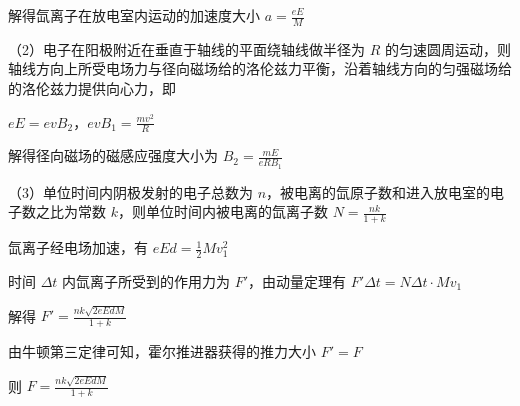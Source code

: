 \documentclass[\gkver]{gaokaozhenti}
\begin{document}
\begin{enumerate}
{解得氙离子在放电室内运动的加速度大小 $a = \frac{eE}{M}$

（2）电子在阳极附近在垂直于轴线的平面绕轴线做半径为 $R$ 的匀速圆周运动，则轴线方向上所受电场力与径向磁场给的洛伦兹力平衡，沿着轴线方向的匀强磁场给的洛伦兹力提供向心力，即

$eE = evB_{2}$，$evB_{1} = \frac{mv^{2}}{R}$

解得径向磁场的磁感应强度大小为 $B_{2} = \frac{mE}{eRB_{1}}$

（3）单位时间内阴极发射的电子总数为 $n$，被电离的氙原子数和进入放电室的电子数之比为常数 $k$，则单位时间内被电离的氙离子数 $N = \frac{nk}{1 + k}$

氙离子经电场加速，有 $eEd = \frac{1}{2}Mv_{1}^{2}$

时间 $\Delta t$ 内氙离子所受到的作用力为 $F'$，由动量定理有 $F'\Delta t = N\Delta t\cdot Mv_{1}$

解得 $F' = \frac{nk\sqrt{2eEdM}}{1 + k}$

由牛顿第三定律可知，霍尔推进器获得的推力大小 $F' = F$

则 $F = \frac{nk\sqrt{2eEdM}}{1 + k}$
}

\end{enumerate}
\end{document}
